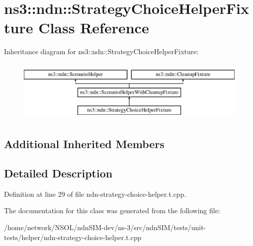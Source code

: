 \hypertarget{classns3_1_1ndn_1_1StrategyChoiceHelperFixture}{}\section{ns3\+:\+:ndn\+:\+:Strategy\+Choice\+Helper\+Fixture Class Reference}
\label{classns3_1_1ndn_1_1StrategyChoiceHelperFixture}
Inheritance diagram for ns3\+:\+:ndn\+:\+:Strategy\+Choice\+Helper\+Fixture\+:\begin{figure}[H]
\begin{center}
\leavevmode
\includegraphics[height=3.000000cm]{classns3_1_1ndn_1_1StrategyChoiceHelperFixture}
\end{center}
\end{figure}
\subsection*{Additional Inherited Members}


\subsection{Detailed Description}


Definition at line 29 of file ndn-\/strategy-\/choice-\/helper.\+t.\+cpp.



The documentation for this class was generated from the following file\+:\begin{DoxyCompactItemize}
\item 
/home/network/\+N\+S\+O\+L/ndn\+S\+I\+M-\/dev/ns-\/3/src/ndn\+S\+I\+M/tests/unit-\/tests/helper/ndn-\/strategy-\/choice-\/helper.\+t.\+cpp\end{DoxyCompactItemize}

